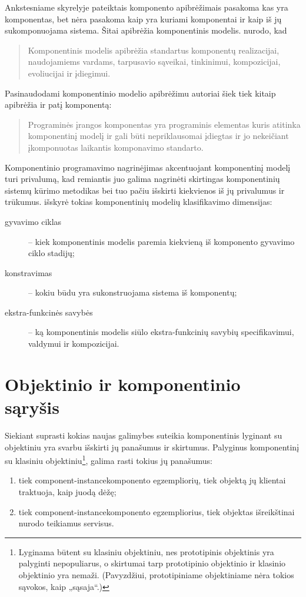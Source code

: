 Ankstesniame skyrelyje pateiktais komponento apibrėžimais pasakoma kas
yra komponentas, bet nėra pasakoma kaip yra kuriami komponentai ir kaip
iš jų sukomponuojama sistema. Šitai apibrėžia komponentinis
modelis. \cite[37]{heineman2001component} nurodo, kad
\begin{quote}
  Komponentinis modelis apibrėžia standartus komponentų realizacijai,
  naudojamiems vardams, tarpusavio sąveikai, tinkinimui, kompozicijai,
  evoliucijai ir įdiegimui.
\end{quote}
Pasinaudodami komponentinio modelio apibrėžimu autoriai šiek tiek
kitaip apibrėžia ir patį komponentą\cite[7]{heineman2001component}:
\begin{quote}
  Programinės įrangos komponentas yra programinis elementas kuris
  atitinka komponentinį modelį ir gali būti nepriklausomai įdiegtas
  ir jo nekeičiant įkomponuotas laikantis komponavimo standarto.
\end{quote}

Komponentinio programavimo nagrinėjimas akcentuojant komponentinį modelį
turi privalumą, kad remiantis juo galima nagrinėti skirtingas
komponentinių sistemų kūrimo metodikas bei tuo pačiu išskirti
kiekvienos iš jų privalumus ir trūkumus.
\cite[4]{classification-framework-for-scm} išskyrė tokias komponentinių
modelių klasifikavimo dimensijas:
\begin{description}
  \item[gyvavimo ciklas] – kiek komponentinis modelis paremia kiekvieną
    iš komponento gyvavimo ciklo stadijų;
  \item[konstravimas] – kokiu būdu yra sukonstruojama sistema iš
    komponentų;
  \item[ekstra-funkcinės savybės] – ką komponentinis modelis siūlo
    ekstra-funkcinių savybių specifikavimui, valdymui ir kompozicijai.
\end{description}

\section{Objektinio ir komponentinio sąryšis}

Siekiant suprasti kokias naujas galimybes suteikia komponentinis
lyginant su objektiniu yra svarbu išskirti jų panašumus ir skirtumus.
Palyginus komponentinį su klasiniu objektiniu\footnote{Lyginama
būtent su klasiniu objektiniu, nes prototipinis objektinis yra
palyginti nepopuliarus, o skirtumai tarp prototipinio objektinio
ir klasinio objektinio yra nemaži. (Pavyzdžiui, prototipiniame
objektiniame nėra tokios sąvokos, kaip „sąsaja“.)}, galima rasti
tokius jų panašumus:
\begin{enumerate}
  \item tiek \gls{component-instance}{komponento egzempliorių}, tiek
    objektą jų klientai traktuoja, kaip juodą dėžę;
  \item tiek \gls{component-instance}{komponento egzempliorius}, tiek
    objektas išreikštinai nurodo teikiamus servisus.
\end{enumerate}

